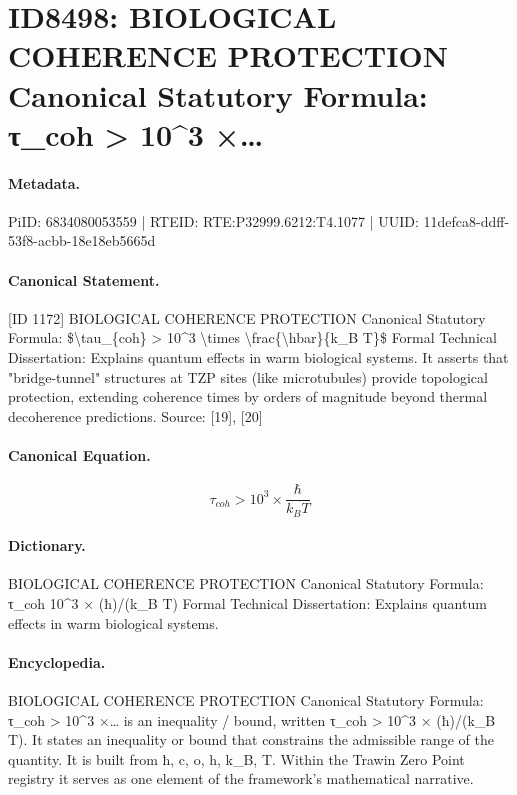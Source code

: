 \section*{ID8498: BIOLOGICAL COHERENCE PROTECTION Canonical Statutory Formula: τ\_coh > 10\textasciicircum{}3 ×…}
\paragraph{Metadata.}
PiID: 6834080053559 | RTEID: RTE:P32999.6212:T4.1077 | UUID: 11defca8-ddff-53f8-acbb-18e18eb5665d

\paragraph{Canonical Statement.}
[ID 1172] BIOLOGICAL COHERENCE PROTECTION Canonical Statutory Formula: \$\textbackslash{}tau\_\{coh\} > 10\textasciicircum{}3 \textbackslash{}times \textbackslash{}frac\{\textbackslash{}hbar\}\{k\_B T\}\$ Formal Technical Dissertation: Explains quantum effects in warm biological systems. It asserts that "bridge-tunnel" structures at TZP sites (like microtubules) provide topological protection, extending coherence times by orders of magnitude beyond thermal decoherence predictions. Source: [19], [20]

\paragraph{Canonical Equation.}
\[
\tau_{coh} > 10^3 \times \frac{\hbar}{k_B T}
\]

\paragraph{Dictionary.}
BIOLOGICAL COHERENCE PROTECTION Canonical Statutory Formula: τ\_coh 10\textasciicircum{}3 × (ħ)/(k\_B T) Formal Technical Dissertation: Explains quantum effects in warm biological systems.

\paragraph{Encyclopedia.}
BIOLOGICAL COHERENCE PROTECTION Canonical Statutory Formula: τ\_coh > 10\textasciicircum{}3 ×… is an inequality / bound, written τ\_coh > 10\textasciicircum{}3 × (ħ)/(k\_B T). It states an inequality or bound that constrains the admissible range of the quantity. It is built from ħ, c, o, h, k\_B, T. Within the Trawin Zero Point registry it serves as one element of the framework's mathematical narrative.
